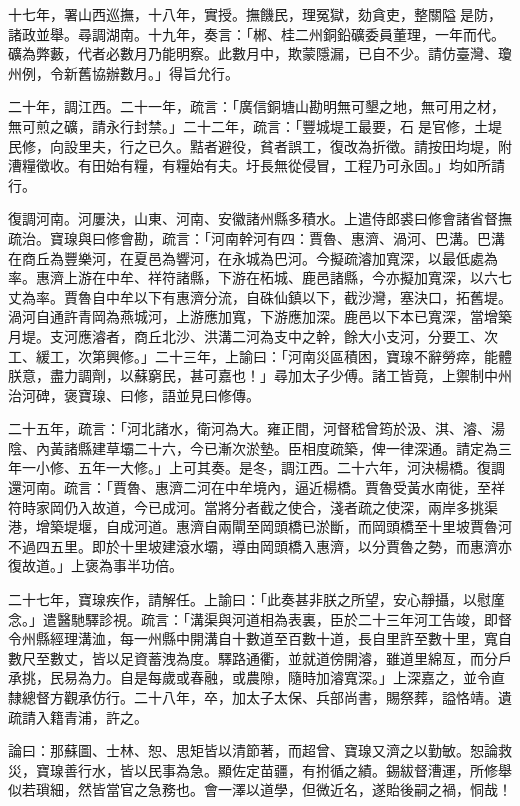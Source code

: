 \begin{pinyinscope}
十七年，署山西巡撫，十八年，實授。撫饑民，理冤獄，劾貪吏，整關隘是防，諸政並舉。尋調湖南。十九年，奏言：「郴、桂二州銅鉛礦委員董理，一年而代。礦為弊藪，代者必數月乃能明察。此數月中，欺蒙隱漏，已自不少。請仿臺灣、瓊州例，令新舊協辦數月。」得旨允行。

二十年，調江西。二十一年，疏言：「廣信銅塘山勘明無可墾之地，無可用之材，無可煎之礦，請永行封禁。」二十二年，疏言：「豐城堤工最要，石是官修，土堤民修，向設里夫，行之已久。黠者避役，貧者誤工，復改為折徵。請按田均堤，附漕糧徵收。有田始有糧，有糧始有夫。圩長無從侵冒，工程乃可永固。」均如所請行。

復調河南。河屢決，山東、河南、安徽諸州縣多積水。上遣侍郎裘曰修會諸省督撫疏治。寶瑔與曰修會勘，疏言：「河南幹河有四：賈魯、惠濟、渦河、巴溝。巴溝在商丘為豐樂河，在夏邑為響河，在永城為巴河。今擬疏濬加寬深，以最低處為率。惠濟上游在中牟、祥符諸縣，下游在柘城、鹿邑諸縣，今亦擬加寬深，以六七丈為率。賈魯自中牟以下有惠濟分流，自硃仙鎮以下，截沙灣，塞決口，拓舊堤。渦河自通許青岡為燕城河，上游應加寬，下游應加深。鹿邑以下本已寬深，當增築月堤。支河應濬者，商丘北沙、洪溝二河為支中之幹，餘大小支河，分要工、次工、緩工，次第興修。」二十三年，上諭曰：「河南災區積困，寶瑔不辭勞瘁，能體朕意，盡力調劑，以蘇窮民，甚可嘉也！」尋加太子少傅。諸工皆竟，上禦制中州治河碑，褒寶瑔、曰修，語並見曰修傳。

二十五年，疏言：「河北諸水，衛河為大。雍正間，河督嵇曾筠於汲、淇、濬、湯陰、內黃諸縣建草壩二十六，今已漸次淤墊。臣相度疏築，俾一律深通。請定為三年一小修、五年一大修。」上可其奏。是冬，調江西。二十六年，河決楊橋。復調還河南。疏言：「賈魯、惠濟二河在中牟境內，逼近楊橋。賈魯受黃水南徙，至祥符時家岡仍入故道，今已成河。當將分者截之使合，淺者疏之使深，兩岸多挑渠港，增築堤堰，自成河道。惠濟自兩閘至岡頭橋已淤斷，而岡頭橋至十里坡賈魯河不過四五里。即於十里坡建滾水壩，導由岡頭橋入惠濟，以分賈魯之勢，而惠濟亦復故道。」上褒為事半功倍。

二十七年，寶瑔疾作，請解任。上諭曰：「此奏甚非朕之所望，安心靜攝，以慰廑念。」遣醫馳驛診視。疏言：「溝渠與河道相為表裏，臣於二十三年河工告竣，即督令州縣經理溝洫，每一州縣中開溝自十數道至百數十道，長自里許至數十里，寬自數尺至數丈，皆以足資蓄洩為度。驛路通衢，並就道傍開濬，雖道里綿亙，而分戶承挑，民易為力。自是每歲或春融，或農隙，隨時加濬寬深。」上深嘉之，並令直隸總督方觀承仿行。二十八年，卒，加太子太保、兵部尚書，賜祭葬，謚恪靖。遺疏請入籍青浦，許之。

論曰：那蘇圖、士林、恕、思矩皆以清節著，而超曾、寶瑔又濟之以勤敏。恕論救災，寶瑔善行水，皆以民事為急。顯佐定苗疆，有拊循之績。錫紱督漕運，所修舉似若瑣細，然皆當官之急務也。會一澤以道學，但微近名，遂貽後嗣之禍，恫哉！


\end{pinyinscope}